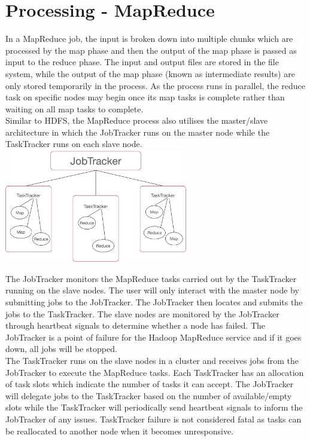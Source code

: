 \documentclass[11pt]{book}
\begin{document}
\section{Processing - MapReduce}

In a MapReduce job, the input is broken down into multiple chunks which are processed by the map phase and then the output of the map phase is passed as input to the reduce phase. The input and output files are stored in the file system, while the output of the map phase (known as intermediate results) are only stored temporarily in the process. As the process runs in parallel, the reduce task on specific nodes may begin once its map tasks is complete rather than waiting on all map tasks to complete.\\

Similar to HDFS, the MapReduce process also utilises the master/slave architecture in which the JobTracker runs on the master node while the TaskTracker runs on each slave node. \\

\includegraphics[width=8cm]{jobtracker}

The JobTracker monitors the MapReduce tasks carried out by the TaskTracker running on the slave nodes. The user will only interact with the master node by submitting jobs to the JobTracker. The JobTracker then locates and submits the jobs to the TaskTracker. The slave nodes are monitored by the JobTracker through heartbeat signals to determine whether a node has failed. The JobTracker is a point of failure for the Hadoop MapReduce service and if it goes down, all jobs will be stopped. \\

The TaskTracker runs on the slave nodes in a cluster and receives jobs from the JobTracker to execute the MapReduce tasks. Each TaskTracker has an allocation of task slots which indicate the number of tasks it can accept. The JobTracker will delegate jobs to the TaskTracker based on the number of available/empty slots while the TaskTracker will periodically send heartbeat signals to inform the JobTracker of any issues. TaskTracker failure is not considered fatal as tasks can be reallocated to another node when it becomes unresponsive.\\
\end{document}
